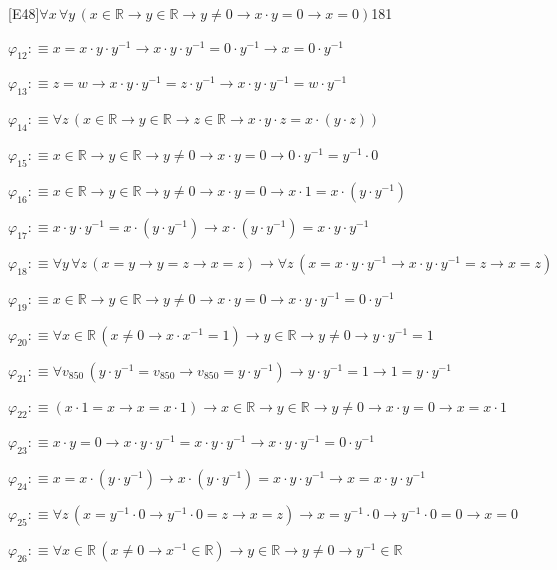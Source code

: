 \begin{fullproof}{[E48]}{$\forall x\,\forall y\,(x \in \mathbb{R} \to y \in \mathbb{R} \to y \neq 0 \to x \cdot y = 0 \to x = 0)$}{181}
\begin{abbrevlist}
\item $\varphi_{12} :\equiv x = x \cdot y \cdot y^{-1} \to x \cdot y \cdot y^{-1} = 0 \cdot y^{-1} \to x = 0 \cdot y^{-1}$
\item $\varphi_{13} :\equiv z = w \to x \cdot y \cdot y^{-1} = z \cdot y^{-1} \to x \cdot y \cdot y^{-1} = w \cdot y^{-1}$
\item $\varphi_{14} :\equiv \forall z\,(x \in \mathbb{R} \to y \in \mathbb{R} \to z \in \mathbb{R} \to x \cdot y \cdot z = x \cdot (y \cdot z))$
\item $\varphi_{15} :\equiv x \in \mathbb{R} \to y \in \mathbb{R} \to y \neq 0 \to x \cdot y = 0 \to 0 \cdot y^{-1} = y^{-1} \cdot 0$
\item $\varphi_{16} :\equiv x \in \mathbb{R} \to y \in \mathbb{R} \to y \neq 0 \to x \cdot y = 0 \to x \cdot 1 = x \cdot (y \cdot y^{-1})$
\item $\varphi_{17} :\equiv x \cdot y \cdot y^{-1} = x \cdot (y \cdot y^{-1}) \to x \cdot (y \cdot y^{-1}) = x \cdot y \cdot y^{-1}$
\item $\varphi_{18} :\equiv \forall y\,\forall z\,(x = y \to y = z \to x = z) \to \forall z\,(x = x \cdot y \cdot y^{-1} \to x \cdot y \cdot y^{-1} = z \to x = z)$
\item $\varphi_{19} :\equiv x \in \mathbb{R} \to y \in \mathbb{R} \to y \neq 0 \to x \cdot y = 0 \to x \cdot y \cdot y^{-1} = 0 \cdot y^{-1}$
\item $\varphi_{20} :\equiv \forall x \in \mathbb{R}\,(x \neq 0 \to x \cdot x^{-1} = 1) \to y \in \mathbb{R} \to y \neq 0 \to y \cdot y^{-1} = 1$
\item $\varphi_{21} :\equiv \forall v_{850}\,(y \cdot y^{-1} = v_{850} \to v_{850} = y \cdot y^{-1}) \to y \cdot y^{-1} = 1 \to 1 = y \cdot y^{-1}$
\item $\varphi_{22} :\equiv (x \cdot 1 = x \to x = x \cdot 1) \to x \in \mathbb{R} \to y \in \mathbb{R} \to y \neq 0 \to x \cdot y = 0 \to x = x \cdot 1$
\item $\varphi_{23} :\equiv x \cdot y = 0 \to x \cdot y \cdot y^{-1} = x \cdot y \cdot y^{-1} \to x \cdot y \cdot y^{-1} = 0 \cdot y^{-1}$
\item $\varphi_{24} :\equiv x = x \cdot (y \cdot y^{-1}) \to x \cdot (y \cdot y^{-1}) = x \cdot y \cdot y^{-1} \to x = x \cdot y \cdot y^{-1}$
\item $\varphi_{25} :\equiv \forall z\,(x = y^{-1} \cdot 0 \to y^{-1} \cdot 0 = z \to x = z) \to x = y^{-1} \cdot 0 \to y^{-1} \cdot 0 = 0 \to x = 0$
\item $\varphi_{26} :\equiv \forall x \in \mathbb{R}\,(x \neq 0 \to x^{-1} \in \mathbb{R}) \to y \in \mathbb{R} \to y \neq 0 \to y^{-1} \in \mathbb{R}$

\end{abbrevlist}
\end{fullproof}

